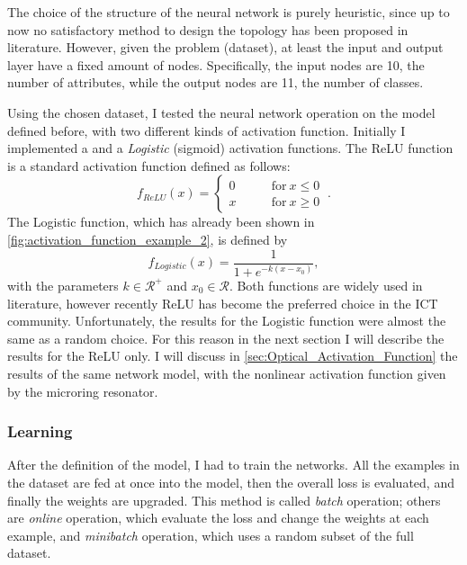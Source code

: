 The choice of the structure of the neural network is purely heuristic, since up to now no satisfactory method to design the topology has been proposed in literature.
However, given the problem (dataset), at least the input and output layer have a fixed amount of nodes.
Specifically, the input nodes are \num{10}, the number of attributes, while the output nodes are \num{11}, the number of classes.

\newpage
Using the chosen dataset, I tested the neural network operation on the model defined before, with two different kinds of activation function.
Initially I implemented a  and a \textit{Logistic} (sigmoid) activation functions.
The \acs{ReLU} function is a standard activation function defined as follows:
\begin{equation}
f_{ReLU}(x) =
\begin{cases}
	0 & \qquad \mathrm{for}~ x\leq 0\\
	x & \qquad \mathrm{for}~ x\geq 0
\end{cases}~.
\label{eq:relu}
\end{equation}
The Logistic function, which has already been shown in \autoref{fig:activation_function_example_2}, is defined by
\begin{equation}
f_{Logistic}(x) = \frac{1}{1+e^{-k\left(x-x_0\right)}},
\end{equation}
with the parameters $k\in \mathcal{R}^+$ and $x_0\in \mathcal{R}$.
Both functions are widely used in literature, however recently \acs{ReLU} has become the preferred choice in the \ac{ICT} community.
Unfortunately, the results for the Logistic function were almost the same as a random choice.
For this reason in the next section I will describe the results for the \acs{ReLU} only.
I will discuss in \autoref{sec:Optical_Activation_Function} the results of the same network model, with the nonlinear activation function given by the microring resonator.

\subsubsection{Learning}
After the definition of the model, I had to train the networks.
All the examples in the dataset are fed at once into the model, then the overall loss is evaluated, and finally the weights are upgraded.
This method is called \textit{batch} operation; others are \textit{online} operation, which evaluate the loss and change the weights at each example, and \textit{minibatch} operation, which uses a random subset of the full dataset.

